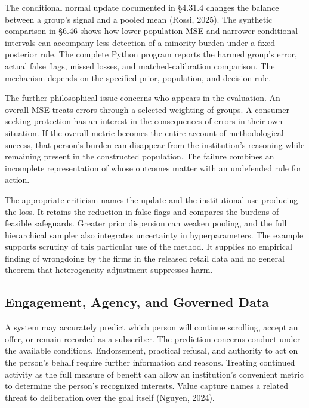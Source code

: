 \noindent \noindent The conditional normal update documented in §4.31.4 changes
the balance between a group's signal and a pooled mean (Rossi, 2025).
The synthetic comparison in §6.46 shows how lower population MSE and
narrower conditional intervals can accompany less detection of a
minority burden under a fixed posterior rule. The complete Python
program reports the harmed group's error, actual false flags, missed
losses, and matched-calibration comparison. The mechanism depends on the
specified prior, population, and decision rule.

The further philosophical issue concerns who appears in the evaluation.
An overall MSE treats errors through a selected weighting of groups. A
consumer seeking protection has an interest in the consequences of
errors in their own situation. If the overall metric becomes the entire
account of methodological success, that person's burden can disappear
from the institution's reasoning while remaining present in the
constructed population. The failure combines an incomplete
representation of whose outcomes matter with an undefended rule for
action.

The appropriate criticism names the update and the institutional use
producing the loss. It retains the reduction in false flags and compares
the burdens of feasible safeguards. Greater prior dispersion can weaken
pooling, and the full hierarchical sampler also integrates uncertainty
in hyperparameters. The example supports scrutiny of this particular use
of the method. It supplies no empirical finding of wrongdoing by the
firms in the released retail data and no general theorem that
heterogeneity adjustment suppresses harm.

\hypertarget{M09-engagement-agency-and-governed-data}{%
\subsection{Engagement, Agency, and Governed
Data}\label{M09-engagement-agency-and-governed-data}}

\noindent \noindent A system may accurately predict which person will continue
scrolling, accept an offer, or remain recorded as a subscriber. The
prediction concerns conduct under the available conditions. Endorsement,
practical refusal, and authority to act on the person's behalf require
further information and reasons. Treating continued activity as the full
measure of benefit can allow an institution's convenient metric to
determine the person's recognized interests. Value capture names a
related threat to deliberation over the goal itself (Nguyen, 2024).

